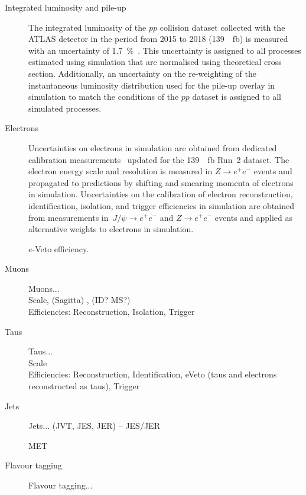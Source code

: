 \begin{description}
\item[Integrated luminosity and pile-up] The integrated luminosity of
  the $pp$ collision dataset collected with the ATLAS detector in the
  period from 2015 to 2018 (\SI{139}{\per\femto\barn}) is measured
  with an uncertainty of
  \SI{1.7}{\percent}~\cite{ATLAS-CONF-2019-021}. This uncertainty is
  assigned to all processes estimated using simulation that are
  normalised using theoretical cross section. Additionally, an
  uncertainty on the re-weighting of the instantaneous luminosity
  distribution used for the pile-up overlay in simulation to match the
  conditions of the $pp$ dataset is assigned to all simulated
  processes.

\item[Electrons] Uncertainties on electrons in simulation are obtained
  from dedicated calibration
  measurements~\cite{EGAM-2018-01,TRIG-2018-05} updated for the
  \SI{139}{\per\femto\barn} Run~2 dataset. The electron energy scale
  and resolution is measured in $Z \to e^+e^-$ events and propagated
  to predictions by shifting and smearing momenta of electrons in
  simulation. Uncertainties on the calibration of electron
  reconstruction, identification, isolation, and trigger efficiencies
  in simulation are obtained from measurements in~$J/\psi \to e^+e^-$
  and $Z \to e^+e^-$ events and applied as alternative weights to
  electrons in simulation.

  $e$-Veto efficiency.

\item[Muons]
  Muons... \cite{MUON-2018-03} \\
  Scale, (Sagitta) , (ID? MS?) \\
  Efficiencies: Reconstruction, Isolation, Trigger

\item[Taus]
  Taus... \\
  Scale \\
  Efficiencies: Reconstruction, Identification, eVeto (taus and
  electrons reconstructed as taus), Trigger

\item[Jets] Jets... (JVT, JES, JER) -- JES/JER \cite{JETM-2018-05}

\item[\pTmissAbs] MET

\item[Flavour tagging] Flavour tagging... \cite{FTAG-2018-01}

\end{description}

